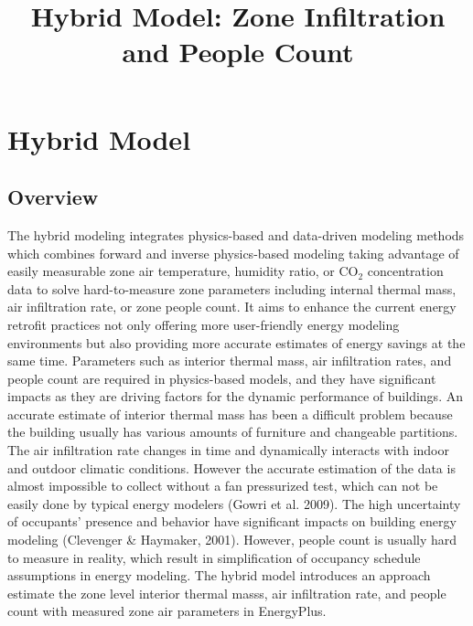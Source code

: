 \documentclass[11pt]{article}
\begin{document}
\title{Hybrid Model: Zone Infiltration and People Count}

\maketitle



\section{Hybrid Model}\label{hybrid-model}

\subsection{Overview}

The hybrid modeling integrates physics-based and data-driven modeling methods which combines forward and inverse physics-based modeling taking advantage of easily measurable zone air temperature, humidity ratio, or CO$_2$ concentration data to solve hard-to-measure zone parameters including internal thermal mass, air infiltration rate, or zone people count. It aims to enhance the current energy retrofit practices not only offering more user-friendly energy modeling environments but also providing more accurate estimates of energy savings at the same time. Parameters such as interior thermal mass, air infiltration rates, and people count are required in physics-based models, and they have significant impacts as they are driving factors for the dynamic performance of buildings. An accurate estimate of interior thermal mass has been a difficult problem because the building usually has various amounts of furniture and changeable partitions. The air infiltration rate changes in time and dynamically interacts with indoor and outdoor climatic conditions. However the accurate estimation of the data is almost impossible to collect without a fan pressurized test, which can not be easily done by typical energy modelers (Gowri et al. 2009). The high uncertainty of occupants’ presence and behavior have significant impacts on building energy modeling (Clevenger \& Haymaker, 2001). However, people count is usually hard to measure in reality, which result in simplification of occupancy schedule assumptions in energy modeling. The hybrid model introduces an approach estimate the zone level interior thermal masss, air infiltration rate, and people count with measured zone air parameters in EnergyPlus.
\end{document}
